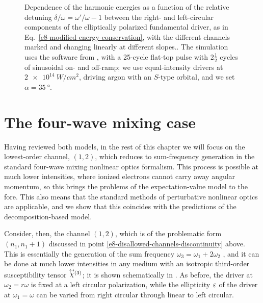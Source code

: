 \begin{figure}[t]
  \captionsetup{width=\textwidth}
  \caption[
  Harmonic spectra for detuned bicircular drivers as a function of the relative detuning $\delta=\omega'/\omega-1$ between the right- and left-circular components of the elliptically polarized fundamental driver
  ]{
  Dependence of the harmonic energies as a function of the relative detuning $\delta/\omega = \omega'/ \omega-1$ between the right- and left-circular components of the elliptically polarized fundamental driver, as in Eq.~\eqref{e8-modified-energy-conservation}, with the different channels marked and changing linearly at different slopes..
  The simulation uses the software from , with a 25-cycle flat-top pulse with 2$\tfrac 12$ cycles of sinusoidal on- and off-ramp; we use equal-intensity drivers at $\SI{2e14}{W/cm^2}$, driving argon with an $S$-type orbital, and we set $\alpha=\SI{35}{\degree}$.
  }
  \label{f8-SFA-splittings-spectrum}
\end{figure}









\section{The four-wave mixing case}
\label{sec:four-wave-mixing}

Having reviewed both models, in the rest of this chapter we will focus on the lowest-order channel, $(1,2)$, which reduces to sum-frequency generation in the standard four-wave mixing nonlinear optics formalism. This process is possible at much lower intensities, where ionized electrons cannot carry away angular momentum, so this brings the problems of the expectation-value model to the fore. This also means that the standard methods of perturbative nonlinear optics are applicable, and we show that this coincides with the predictions of the decomposition-based model.

Consider, then, the channel $(1,2)$, which is of the problematic form $(n_1,n_1+1)$ discussed in point \ref{e8-disallowed-channels-discontinuity} above. This is essentially the generation of the sum frequency $\omega_3=\omega_1+2\omega_2$ \cite{BloembergenSecondHarmonic}, and it can be done at much lower intensities in any medium with an isotropic third-order susceptibility tensor $\stackrel{\leftrightarrow}{\chi}\!\!{}^{(3)}$; it is shown schematically in . As before, the driver at $\omega_2=r\omega$ is fixed at a left circular polarization, while the ellipticity $\varepsilon$ of the driver at $\omega_1=\omega$ can be varied from right circular through linear to left circular.




